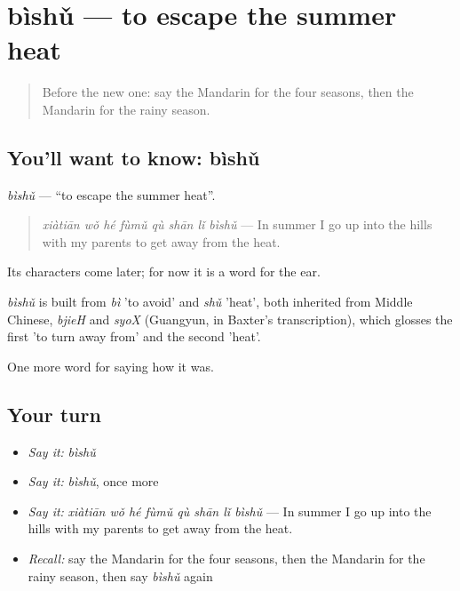 \section[bìshǔ]{bìshǔ — to escape the summer heat}

\label{lesson:ZH-C515-bishu}



\begin{quote}
Before the new one: say the Mandarin for the four seasons, then the Mandarin for the rainy season.
\end{quote}

\subsection*{You'll want to know: bìshǔ}
\emph{bìshǔ} — \textquotedblleft{}to escape the summer heat\textquotedblright{}.

\begin{quote}
\emph{xiàtiān wǒ hé fùmǔ qù shān lǐ bìshǔ} — In summer I go up into the hills with my parents to get away from the heat.
\end{quote}

Its characters come later; for now it is a word for the ear.

\begin{cousinweb}
\emph{bìshǔ} is built from \emph{bì} 'to avoid' and \emph{shǔ} 'heat', both inherited from Middle Chinese, \emph{bjieH} and \emph{syoX} (Guangyun, in Baxter's transcription), which glosses the first 'to turn away from' and the second 'heat'.
\end{cousinweb}

\begin{grammarlens}[title={What you've built}]
One more word for saying how it was.
\end{grammarlens}

\subsection*{Your turn}
\begin{itemize}
\raggedright
  \item \emph{Say it:} \emph{bìshǔ}
  \item \emph{Say it:} \emph{bìshǔ}, once more
  \item \emph{Say it:} \emph{xiàtiān wǒ hé fùmǔ qù shān lǐ bìshǔ} — In summer I go up into the hills with my parents to get away from the heat.
  \item \emph{Recall:} say the Mandarin for the four seasons, then the Mandarin for the rainy season, then say \emph{bìshǔ} again
\end{itemize}

